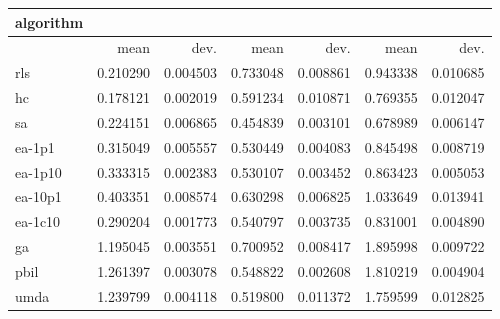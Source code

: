 \begin{tabular}{@{}l*{6}{>{{}}N{1}{2}}@{}}
\toprule
{algorithm} &  &  &  \\
\midrule
& {mean} & {dev.} & {mean} & {dev.} & {mean} & {dev.} \\
\midrule
rls & 0.210290 & 0.004503 & 0.733048 & 0.008861 & 0.943338 & 0.010685 \\
 hc & 0.178121 & 0.002019 & 0.591234 & 0.010871 & 0.769355 & 0.012047 \\
 sa & 0.224151 & 0.006865 & 0.454839 & 0.003101 & 0.678989 & 0.006147 \\
 ea-1p1 & 0.315049 & 0.005557 & 0.530449 & 0.004083 & 0.845498 & 0.008719 \\
 ea-1p10 & 0.333315 & 0.002383 & 0.530107 & 0.003452 & 0.863423 & 0.005053 \\
 ea-10p1 & 0.403351 & 0.008574 & 0.630298 & 0.006825 & 1.033649 & 0.013941 \\
 ea-1c10 & 0.290204 & 0.001773 & 0.540797 & 0.003735 & 0.831001 & 0.004890 \\
 ga & 1.195045 & 0.003551 & 0.700952 & 0.008417 & 1.895998 & 0.009722 \\
 pbil & 1.261397 & 0.003078 & 0.548822 & 0.002608 & 1.810219 & 0.004904 \\
 umda & 1.239799 & 0.004118 & 0.519800 & 0.011372 & 1.759599 & 0.012825 \\
 \bottomrule
\end{tabular}
